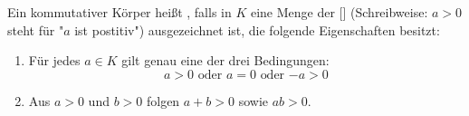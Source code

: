 Ein kommutativer Körper heißt , falls in $K$ eine Menge der [] (Schreibweise: $a > 0$ steht für "$a$ ist postitiv") ausgezeichnet ist, die folgende Eigenschaften besitzt:
\begin{enumerate}
    \item Für jedes $a \in K$ gilt genau eine der drei Bedingungen:
    $$\text{$a > 0$ oder $a = 0$ oder $-a > 0$}$$
    \item Aus $a > 0$ und $b > 0$ folgen $a+b > 0$ sowie $ab > 0$.
\end{enumerate}